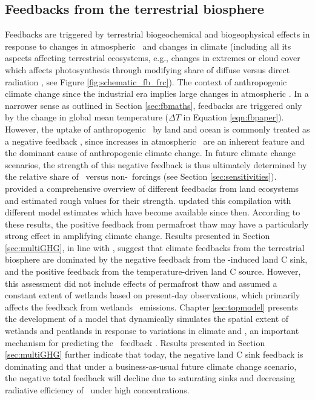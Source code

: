 \begin{samepage}
\subsection{Feedbacks from the terrestrial biosphere}
\label{sec:terrfb}
Feedbacks are triggered by terrestrial biogeochemical and biogeophysical effects in response to changes in atmospheric \coo\ and changes in climate (including all its aspects affecting terrestrial ecosystems, e.g., changes in extremes or cloud cover which affects photosynthesis through modifying share of diffuse versus direct radiation \citep{mercado09}, see Figure \ref{fig:schematic_fb_frc}). The context of anthropogenic climate change since the industrial era implies large changes in atmospheric \coo . In a narrower sense as outlined in Section \ref{sec:fbmaths}, feedbacks are triggered only by the change in global mean temperature ($\Delta T$ in Equation \ref{eqn:fbpaper}). However, the uptake of anthropogenic \coo\ by land and ocean is commonly treated as a negative feedback \citep{gregory09jclim}, since increases in atmospheric \coo\ are an inherent feature and the dominant cause of anthropogenic climate change. In future climate change scenarios, the strength of this negative feedback is thus ultimately determined by the relative share of \coo\ versus non-\coo\ forcings (see Section \ref{sec:sensitivities}).\\

\citet{arneth10ngeo} provided a comprehensive overview of different feedbacks from land ecosystems and estimated rough values for their strength. \citet{ciais13ipcc} updated this compilation with different model estimates which have become available since then. According to these results, the positive feedback from permafrost thaw may have a particularly strong effect in amplifying climate change. Results presented in Section \ref{sec:multiGHG}, in line with \citet{arneth10ngeo}, suggest that climate feedbacks from the terrestrial biosphere are dominated by the negative feedback from the \coo -induced land C sink, and the positive feedback from the temperature-driven land C source. However, this assessment did not include effects of permafrost thaw and assumed a constant extent of wetlands based on present-day observations, which primarily affects the feedback from wetlands \chh\ emissions. Chapter \ref{sec:topmodel} presents the development of a model that dynamically simulates the spatial extent of wetlands and peatlands in response to variations in climate and \coo , an important mechanism for predicting the \chh\ feedback \citep{melton13}. Results presented in Section \ref{sec:multiGHG} further indicate that today, the negative land C sink feedback is dominating and that under a business-as-usual future climate change scenario, the negative total feedback will decline due to saturating sinks and decreasing radiative efficiency of \coo\ under high concentrations.\\
\end{samepage}

